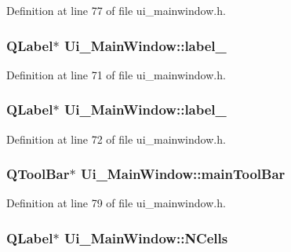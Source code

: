 \-Definition at line 77 of file ui\-\_\-mainwindow.\-h.

\hypertarget{class_ui___main_window_a2e2516d755e4dd53fc905dabddf2738a}{
\subsubsection[{label\-\_\-2}]{\setlength{\rightskip}{0pt plus 5cm}\-Q\-Label$\ast$ {\bf \-Ui\-\_\-\-Main\-Window\-::label\-\_}}}\label{class_ui___main_window_a2e2516d755e4dd53fc905dabddf2738a}


\-Definition at line 71 of file ui\-\_\-mainwindow.\-h.

\hypertarget{class_ui___main_window_a0376fd90247280e7c7957cc70628708c}{
\subsubsection[{label\-\_\-3}]{\setlength{\rightskip}{0pt plus 5cm}\-Q\-Label$\ast$ {\bf \-Ui\-\_\-\-Main\-Window\-::label\-\_}}}\label{class_ui___main_window_a0376fd90247280e7c7957cc70628708c}


\-Definition at line 72 of file ui\-\_\-mainwindow.\-h.

\hypertarget{class_ui___main_window_a5172877001c8c7b4e0f6de50421867d1}{
\subsubsection[{main\-Tool\-Bar}]{\setlength{\rightskip}{0pt plus 5cm}\-Q\-Tool\-Bar$\ast$ {\bf \-Ui\-\_\-\-Main\-Window\-::main\-Tool\-Bar}}}\label{class_ui___main_window_a5172877001c8c7b4e0f6de50421867d1}


\-Definition at line 79 of file ui\-\_\-mainwindow.\-h.

\hypertarget{class_ui___main_window_aea754e8591e2a34ad9fd1b1a0d70a3ff}{
\subsubsection[{\-N\-Cells}]{\setlength{\rightskip}{0pt plus 5cm}\-Q\-Label$\ast$ {\bf \-Ui\-\_\-\-Main\-Window\-::\-N\-Cells}}}\label{class_ui___main_window_aea754e8591e2a34ad9fd1b1a0d70a3ff}


